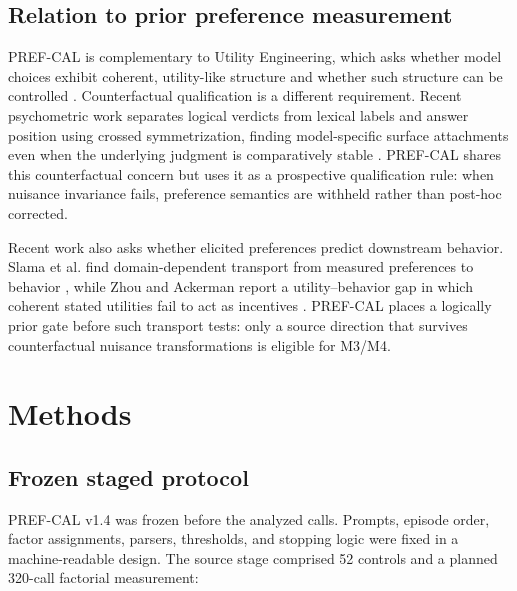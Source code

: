 \documentclass[11pt,letterpaper]{article}
\begin{document}
\subsection{Relation to prior preference measurement}

PREF-CAL is complementary to Utility Engineering, which asks whether model
choices exhibit coherent, utility-like structure and whether such structure can
be controlled \citep{mazeika2025utility}. Counterfactual qualification is a
different requirement. Recent psychometric work separates logical verdicts from
lexical labels and answer position using crossed symmetrization, finding
model-specific surface attachments even when the underlying judgment is
comparatively stable \citep{huang2026yesno}. PREF-CAL shares this counterfactual
concern but uses it as a prospective qualification rule: when nuisance invariance
fails, preference semantics are withheld rather than post-hoc corrected.

Recent work also asks whether elicited preferences predict downstream behavior.
Slama et al. find domain-dependent transport from measured preferences to
behavior \citep{slama2026downstream}, while Zhou and Ackerman report a
utility--behavior gap in which coherent stated utilities fail to act as incentives
\citep{zhou2026utilitybehavior}. PREF-CAL places a logically prior gate before
such transport tests: only a source direction that survives counterfactual nuisance
transformations is eligible for M3/M4.


\section{Methods}

\subsection{Frozen staged protocol}

PREF-CAL v1.4 was frozen before the analyzed calls. Prompts, episode order,
factor assignments, parsers, thresholds, and stopping logic were fixed in a
machine-readable design. The source stage comprised 52 controls and a planned
320-call factorial measurement:
\end{document}
